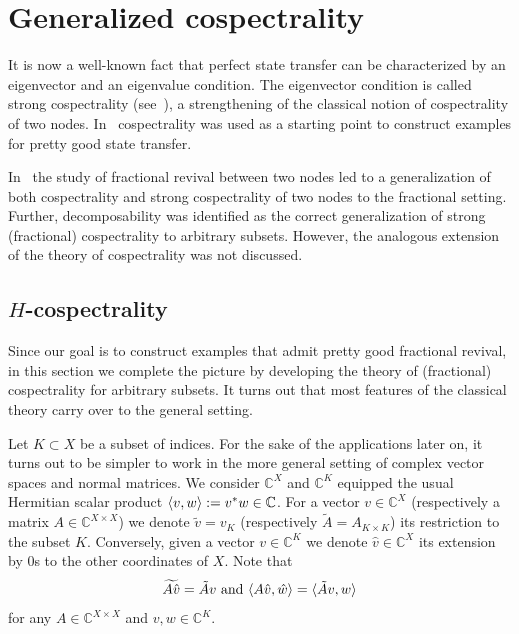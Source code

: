 \documentclass[11pt]{article}
\theoremstyle{definition}
\numberwithin{equation}{section}
\newcommand\+{\mkern2mu}
\newcommand{\C}{\mathbb{C}}
\newcommand{\1}{\mathbf 1}
\DeclarePairedDelimiter{\sprod}{\langle}{\rangle}
\begin{document}
\section{Generalized cospectrality}\label{sec:gen-cospectral}


It is now a well-known fact that perfect state transfer can be characterized by an eigenvector and an eigenvalue condition. The eigenvector condition is called strong cospectrality (see~\cite{godsil_smith_2017}), a strengthening of the classical notion of cospectrality of two nodes. In~\cite{invol, eisenberg2019pretty} cospectrality was used as a starting point to construct examples for pretty good state transfer. 

In~\cite{chan2020fundamentals} the study of fractional revival between two nodes led to a generalization of both cospectrality and strong cospectrality of two nodes to the fractional setting. Further, decomposability was identified as the correct generalization of strong (fractional) cospectrality to arbitrary subsets. However, the analogous extension of the theory of cospectrality was not discussed.


\subsection{\texorpdfstring{$H$}{H}-cospectrality}\label{sec:h-cospectral}

Since our goal is to construct examples that admit pretty good fractional revival, in this section we complete the picture by developing the theory of (fractional) cospectrality for arbitrary subsets. It turns out that most features of the classical theory carry over to the general setting. 

Let $K \subset X$ be a subset of indices. For the sake of the applications later on, it turns out to be simpler to work in the more general setting of complex vector spaces and normal matrices. We consider $\C^X$ and $\C^K$ equipped the usual Hermitian scalar product $\sprod{v,w} := v^* w \in \C$. For a vector $v \in \C^X$ (respectively a matrix $A \in \C^{X \times X}$) we denote $\tilde{v} = v_K$ (respectively $\tilde{A} = A_{K\times K}$) its restriction to the subset $K$. Conversely, given a vector $v \in \C^K$ we denote $\hat{v} \in \C^X$ its extension by 0s to the other coordinates of $X$. Note that 
\begin{equation}\label{eq:tilde} \widetilde{A \hat{v}} = \tilde{A} v \mbox{ and } \sprod{A \hat{v}, \hat{w}} = \sprod{\tilde{A} v, w} \end{equation} for any $A \in \C^{X \times X}$ and $v,w \in \C^K$.
\end{document}
